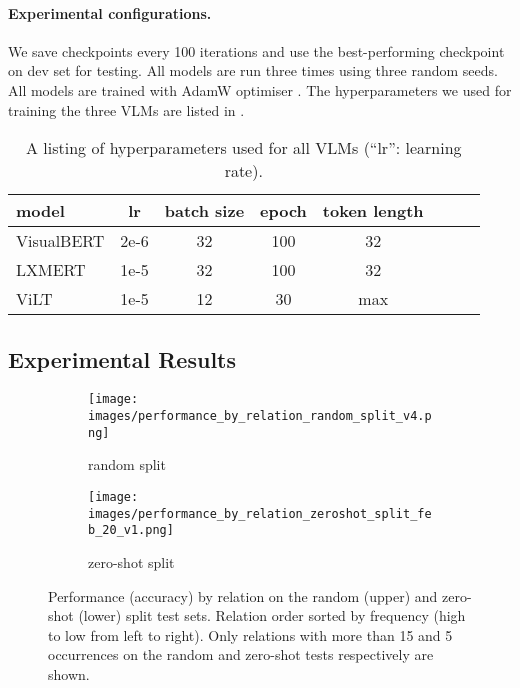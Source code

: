 \paragraph{Experimental configurations.} 
We save checkpoints every 100 iterations and use the best-performing checkpoint on dev set for testing. All models are run three times using three random seeds. All models are trained with AdamW optimiser \citep{loshchilov2018decoupled}. The hyperparameters we used for training the three VLMs
are listed in . 

\begin{table}[!ht] \small
\centering
\setlength{\tabcolsep}{2.3pt}
\begin{tabular}{lccccccc}
\toprule
model & lr &  batch size & epoch & token length \\
\midrule
VisualBERT & 2e-6 & 32 & 100 & 32 \\
LXMERT & 1e-5 & 32 & 100 & 32 \\
ViLT & 1e-5 & 12 & 30 & max \\
\bottomrule
\end{tabular}
\caption{A listing of hyperparameters used for all VLMs (``lr'': learning rate).
}
\label{tab:hparams}
\end{table}



\subsection{Experimental Results}\label{sec:main_results}


\begin{figure*}[th!]
    \centering
\begin{subfigure}[b]{\linewidth}
    \centering
    \texttt{[image: images/performance\_by\_relation\_random\_split\_v4.png]}
\caption{random split}
\end{subfigure}
\begin{subfigure}[b]{\linewidth}
    \centering
    \texttt{[image: images/performance\_by\_relation\_zeroshot\_split\_feb\_20\_v1.png]}
\caption{zero-shot split}
\end{subfigure}
\caption{Performance (accuracy) by relation on the random (upper) and zero-shot (lower) split test sets. Relation order sorted by frequency (high to low from left to right). Only relations with more than 15 and 5 occurrences on the random and zero-shot tests respectively are shown. }
\label{fig:performance_by_rel}
\end{figure*}

